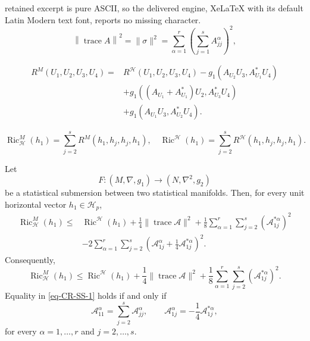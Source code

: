 \documentclass[10pt,a4paper]{amsart}
\begin{document}
retained excerpt is pure ASCII, so the delivered engine, XeLaTeX with its default Latin Modern text font, reports no missing character.
\begin{equation}
\left\|\operatorname{trace}A\right\|^{2}
=
\|\sigma\|^{2}
=
\sum_{\alpha=1}^{r}
\left(
\sum_{j=1}^{s}A_{jj}^{\alpha}
\right)^{2},
\label{eq-nrm-A}
\end{equation}

\begin{align}
R^{M}(U_1,U_2,U_3,U_4)
={}&
R^{\mathcal H}(U_1,U_2,U_3,U_4)
-
g_1(A_{U_2}U_3,A^{*}_{U_1}U_4)
\nonumber\\
&+
g_1\left(
(A_{U_1}+A^{*}_{U_1})U_2,
A^{*}_{U_3}U_4
\right)
\nonumber\\
&+
g_1(A_{U_1}U_3,A^{*}_{U_2}U_4).
\label{eq-Gauss-hor}
\end{align}

\begin{equation}
\operatorname{Ric}_{\mathcal H}^{M}(h_1)
=
\sum_{j=2}^{s}
R^{M}(h_1,h_j,h_j,h_1), \quad \operatorname{Ric}^{\mathcal H}(h_1)
=
\sum_{j=2}^{s}
R^{\mathcal H}(h_1,h_j,h_j,h_1).
\label{eq-Ric-hor}
\end{equation}

\begin{theorem}
Let
\[
F:(M,\nabla ,g_{1})\longrightarrow (N,\nabla ^2,g_{2})
\]
be a statistical submersion between two statistical manifolds. Then, for
every unit horizontal vector $h_{1}\in\mathcal H_{p}$,
\begin{align}
\operatorname{Ric}_{\mathcal H}^{M}(h_{1})
\leq{}&
\operatorname{Ric}^{\mathcal H}(h_{1})
+\frac14\|\operatorname{trace}\mathcal A\|^{2}
+\frac18\sum_{\alpha=1}^{r}\sum_{j=2}^{s}
(\mathcal A_{1j}^{*\alpha})^{2}
\nonumber\\
&-2\sum_{\alpha=1}^{r}\sum_{j=2}^{s}
\left(
\mathcal A_{1j}^{\alpha}
+\frac14\mathcal A_{1j}^{*\alpha}
\right)^{2}.
\label{eq-CR-SS}
\end{align}
Consequently,
\begin{equation}
\operatorname{Ric}_{\mathcal H}^{M}(h_{1})
\leq
\operatorname{Ric}^{\mathcal H}(h_{1})
+\frac14\|\operatorname{trace}\mathcal A\|^{2}
+\frac18\sum_{\alpha=1}^{r}\sum_{j=2}^{s}
(\mathcal A_{1j}^{*\alpha})^{2}.
\label{eq-CR-SS-1}
\end{equation}
Equality in \eqref{eq-CR-SS-1} holds if and only if
\[
\mathcal A_{11}^{\alpha}
=
\sum_{j=2}^{s}\mathcal A_{jj}^{\alpha},
\qquad
\mathcal A_{1j}^{\alpha}
=
-\frac14\mathcal A_{1j}^{*\alpha},
\]
for every $\alpha=1,\ldots,r$ and $j=2,\ldots,s$.
\end{theorem}
\end{document}
